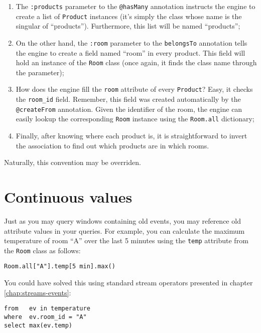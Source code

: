 \documentclass{report}
\begin{document}
\begin{enumerate}
\item The \verb=:products= parameter to the \verb=@hasMany= annotation
  instructs the engine to create a list of \verb=Product= instances
  (it's simply the class whose name is the singular of
  ``products''). Furthermore, this list will be named ``products'';
\item On the other hand, the \verb=:room= parameter to the
  \verb=belongsTo= annotation tells the engine to create a field named
  ``room'' in every product. This field will hold an instance of the
  \verb=Room= class (once again, it finds the class name through the
  parameter);
\item How does the engine fill the \verb=room= attribute of every
  \verb=Product=? Easy, it checks the \verb=room_id= field. Remember,
  this field was created automatically by the \verb=@createFrom=
  annotation. Given the identifier of the room, the engine can easily
  lookup the corresponding \verb=Room= instance using the
  \verb=Room.all= dictionary;
\item Finally, after knowing where each product is, it is
  straightforward to invert the association to find out which products
  are in which rooms.
\end{enumerate}

Naturally, this convention may be overriden.


\chapter{Continuous values}
Just as you may query windows containing old events, you may reference
old attribute values in your queries. For example, you can calculate
the maximum temperature of room ``A'' over the last 5 minutes using
the \verb=temp= attribute from the \verb=Room= class as follows:

\begin{verbatim}
Room.all["A"].temp[5 min].max()
\end{verbatim}

You could have solved this using standard stream operators presented
in chapter \ref{chap:streams-events}:

\begin{verbatim}
from   ev in temperature
where  ev.room_id = "A"
select max(ev.temp)
\end{verbatim}
\end{document}
